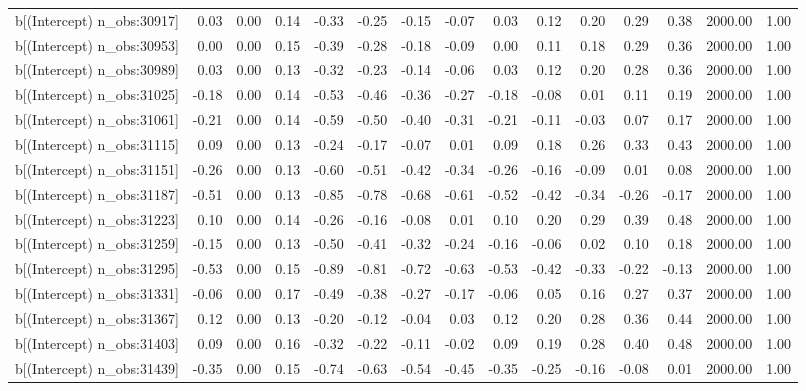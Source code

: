\begin{table}[ht]
\begin{tabular}{rrrrrrrrrrrrrrr}
  b[(Intercept) n\_obs:30917] & 0.03 & 0.00 & 0.14 & -0.33 & -0.25 & -0.15 & -0.07 & 0.03 & 0.12 & 0.20 & 0.29 & 0.38 & 2000.00 & 1.00 \\ 
  b[(Intercept) n\_obs:30953] & 0.00 & 0.00 & 0.15 & -0.39 & -0.28 & -0.18 & -0.09 & 0.00 & 0.11 & 0.18 & 0.29 & 0.36 & 2000.00 & 1.00 \\ 
  b[(Intercept) n\_obs:30989] & 0.03 & 0.00 & 0.13 & -0.32 & -0.23 & -0.14 & -0.06 & 0.03 & 0.12 & 0.20 & 0.28 & 0.36 & 2000.00 & 1.00 \\ 
  b[(Intercept) n\_obs:31025] & -0.18 & 0.00 & 0.14 & -0.53 & -0.46 & -0.36 & -0.27 & -0.18 & -0.08 & 0.01 & 0.11 & 0.19 & 2000.00 & 1.00 \\ 
  b[(Intercept) n\_obs:31061] & -0.21 & 0.00 & 0.14 & -0.59 & -0.50 & -0.40 & -0.31 & -0.21 & -0.11 & -0.03 & 0.07 & 0.17 & 2000.00 & 1.00 \\ 
  b[(Intercept) n\_obs:31115] & 0.09 & 0.00 & 0.13 & -0.24 & -0.17 & -0.07 & 0.01 & 0.09 & 0.18 & 0.26 & 0.33 & 0.43 & 2000.00 & 1.00 \\ 
  b[(Intercept) n\_obs:31151] & -0.26 & 0.00 & 0.13 & -0.60 & -0.51 & -0.42 & -0.34 & -0.26 & -0.16 & -0.09 & 0.01 & 0.08 & 2000.00 & 1.00 \\ 
  b[(Intercept) n\_obs:31187] & -0.51 & 0.00 & 0.13 & -0.85 & -0.78 & -0.68 & -0.61 & -0.52 & -0.42 & -0.34 & -0.26 & -0.17 & 2000.00 & 1.00 \\ 
  b[(Intercept) n\_obs:31223] & 0.10 & 0.00 & 0.14 & -0.26 & -0.16 & -0.08 & 0.01 & 0.10 & 0.20 & 0.29 & 0.39 & 0.48 & 2000.00 & 1.00 \\ 
  b[(Intercept) n\_obs:31259] & -0.15 & 0.00 & 0.13 & -0.50 & -0.41 & -0.32 & -0.24 & -0.16 & -0.06 & 0.02 & 0.10 & 0.18 & 2000.00 & 1.00 \\ 
  b[(Intercept) n\_obs:31295] & -0.53 & 0.00 & 0.15 & -0.89 & -0.81 & -0.72 & -0.63 & -0.53 & -0.42 & -0.33 & -0.22 & -0.13 & 2000.00 & 1.00 \\ 
  b[(Intercept) n\_obs:31331] & -0.06 & 0.00 & 0.17 & -0.49 & -0.38 & -0.27 & -0.17 & -0.06 & 0.05 & 0.16 & 0.27 & 0.37 & 2000.00 & 1.00 \\ 
  b[(Intercept) n\_obs:31367] & 0.12 & 0.00 & 0.13 & -0.20 & -0.12 & -0.04 & 0.03 & 0.12 & 0.20 & 0.28 & 0.36 & 0.44 & 2000.00 & 1.00 \\ 
  b[(Intercept) n\_obs:31403] & 0.09 & 0.00 & 0.16 & -0.32 & -0.22 & -0.11 & -0.02 & 0.09 & 0.19 & 0.28 & 0.40 & 0.48 & 2000.00 & 1.00 \\ 
  b[(Intercept) n\_obs:31439] & -0.35 & 0.00 & 0.15 & -0.74 & -0.63 & -0.54 & -0.45 & -0.35 & -0.25 & -0.16 & -0.08 & 0.01 & 2000.00 & 1.00 \\ 

\end{tabular}
\end{table}
